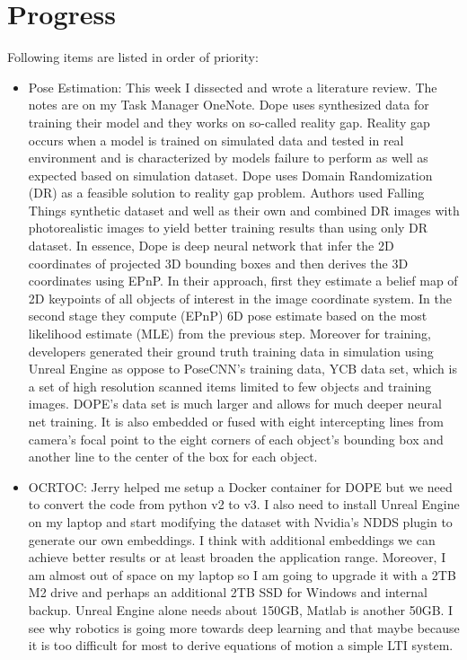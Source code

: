 \documentclass[11pt]{article}
\begin{document}
\section{Progress}
Following items are listed in order of priority:
\begin{itemize}

	\item Pose Estimation: This week I dissected \cite{Dope} and wrote a literature review. The notes are on my Task Manager OneNote. Dope uses synthesized data for training their model and they works on so-called reality gap. Reality gap occurs when a model is trained on simulated data and tested in real environment and is characterized by models failure to perform as well as expected based on simulation dataset.
	      Dope uses Domain Randomization (DR) as a feasible solution to reality gap problem. Authors used Falling Things synthetic dataset and well as their own and combined DR images with photorealistic images to yield better training results than using only DR dataset. In essence, Dope is deep neural network that infer the 2D coordinates of projected 3D bounding boxes and then derives the 3D coordinates using EPnP.
	      In their approach, first they estimate a belief map of 2D keypoints of
	      all objects of interest in the image coordinate system. In the second
	      stage they compute (EPnP) 6D pose estimate based on the most likelihood
	      estimate (MLE) from the previous step.
	      Moreover for training, developers generated their ground truth training
	      data in simulation using Unreal Engine as oppose to PoseCNN's training
	      data, YCB data set, which is a set of high resolution scanned items limited to few objects and training images. DOPE's data set is much larger and allows for much deeper neural net training. It is also embedded or fused with eight intercepting lines from camera's focal point to the eight corners of each object's bounding box and another line to the center of the box for each object.

	\item OCRTOC: Jerry helped me setup a Docker container for DOPE but we need to convert the code from python v2 to v3. I also need to install Unreal Engine on my laptop and start modifying the dataset with Nvidia's NDDS plugin to generate our own embeddings. I think with additional
	      embeddings we can achieve better results or at least broaden the
	      application range. Moreover, I am almost out of space on my laptop so I am going to upgrade it with a 2TB M2 drive and perhaps an additional 2TB SSD for Windows and internal backup. Unreal Engine alone needs about
	      150GB, Matlab is another 50GB. I see why robotics is going more towards deep learning and that maybe because it is too difficult for most to derive equations of motion a simple LTI system.


\end{itemize}
\end{document}
